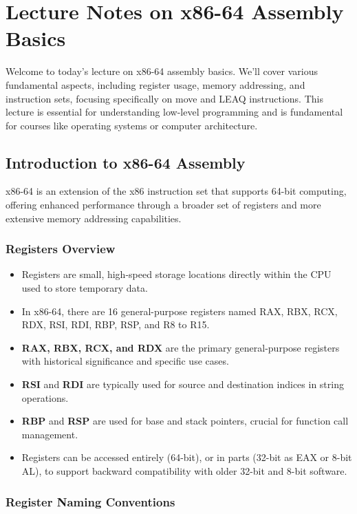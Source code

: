 \documentclass{article}
\begin{document}
\tableofcontents
\newpage

\section{Lecture Notes on x86-64 Assembly Basics}

Welcome to today’s lecture on x86-64 assembly basics. We’ll cover various fundamental aspects, including register usage, memory addressing, and instruction sets, focusing specifically on move and LEAQ instructions. This lecture is essential for understanding low-level programming and is fundamental for courses like operating systems or computer architecture.

\subsection{Introduction to x86-64 Assembly}

x86-64 is an extension of the x86 instruction set that supports 64-bit computing, offering enhanced performance through a broader set of registers and more extensive memory addressing capabilities.

\subsubsection{Registers Overview}

\begin{itemize}
  \item Registers are small, high-speed storage locations directly within the CPU used to store temporary data.
  \item In x86-64, there are 16 general-purpose registers named RAX, RBX, RCX, RDX, RSI, RDI, RBP, RSP, and R8 to R15.
  \item \textbf{RAX, RBX, RCX, and RDX} are the primary general-purpose registers with historical significance and specific use cases.
  \item \textbf{RSI} and \textbf{RDI} are typically used for source and destination indices in string operations.
  \item \textbf{RBP} and \textbf{RSP} are used for base and stack pointers, crucial for function call management.
  \item Registers can be accessed entirely (64-bit), or in parts (32-bit as EAX or 8-bit AL), to support backward compatibility with older 32-bit and 8-bit software.
\end{itemize}

\subsubsection{Register Naming Conventions}
\end{document}
